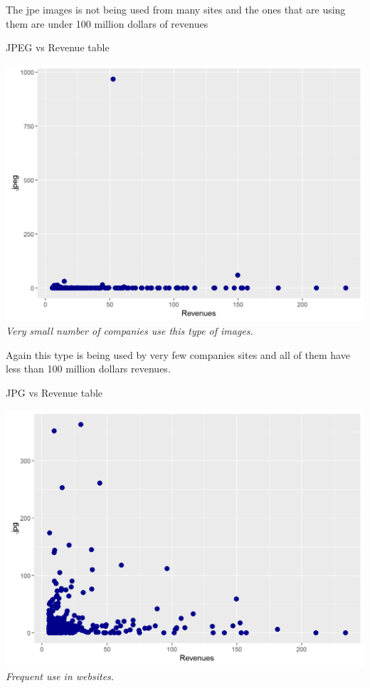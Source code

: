 \documentclass{article}
\begin{document}
The jpe images is not being used from many sites and the ones that are using them are under 100 million dollars of revenues
\begin{table}[H]
\centering
\caption{JPEG vs Revenue table}
\begin{center}
\includegraphics[scale=0.5]{../R/photos/58_jpeg_rev.png}    \\
\textit{Very small number of companies use this type of images.}
\end{center}
\end{table}
Again this type is being used by very few companies sites and all of them have less than 100 million dollars revenues.
\begin{table}[H]
\centering
\caption{JPG vs Revenue table}
\begin{center}
\includegraphics[scale=0.5]{../R/photos/59_jpg_rev.png}    \\
\textit{Frequent use in websites.}
\end{center}
\end{table}
\end{document}
